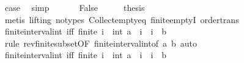 \begin{isabellebody}
\ {\isacharquery}{\kern0pt}case\ \isamarkupfalse%
\ simp\isanewline
\ \ \isamarkupfalse%
\isanewline
{}\isamarkupfalse%
\isanewline
\ \ \isamarkupfalse%
\ False\isanewline
\ \ \isamarkupfalse%
\ \isamarkupfalse%
\ {\isacharquery}{\kern0pt}thesis\isanewline
\ \ \ \ \isamarkupfalse%
\ {\isacharparenleft}{\kern0pt}metis\ {\isacharparenleft}{\kern0pt}lifting{\isacharcomma}{\kern0pt}\ no{\isacharunderscore}{\kern0pt}types{\isacharparenright}{\kern0pt}\ Collect{\isacharunderscore}{\kern0pt}empty{\isacharunderscore}{\kern0pt}eq\ finite{\isachardot}{\kern0pt}emptyI\ order{\isacharunderscore}{\kern0pt}trans{\isacharparenright}{\kern0pt}\isanewline
{}\isamarkupfalse%
%
\endisatagproof
{\isafoldproof}%
%
\isadelimproof
\isanewline
%
\endisadelimproof
\isanewline
{}\isamarkupfalse%
\ finite{\isacharunderscore}{\kern0pt}interval{\isacharunderscore}{\kern0pt}int{}\ {\isacharbrackleft}{\kern0pt}iff{\isacharbrackright}{\kern0pt}{\isacharcolon}{\kern0pt}\ {\isachardoublequoteopen}finite\ {\isacharbraceleft}{\kern0pt}i\ {\isacharcolon}{\kern0pt}{\isacharcolon}{\kern0pt}\ int{\isachardot}{\kern0pt}\ a\ {\isasymle}\ i\ {\isasymand}\ i\ {\isacharless}{\kern0pt}\ b{\isacharbraceright}{\kern0pt}{\isachardoublequoteclose}\isanewline
%
\isadelimproof
\ \ %
\endisadelimproof
%
\isatagproof
{}\isamarkupfalse%
\ {\isacharparenleft}{\kern0pt}rule\ rev{\isacharunderscore}{\kern0pt}finite{\isacharunderscore}{\kern0pt}subset{\isacharbrackleft}{\kern0pt}OF\ finite{\isacharunderscore}{\kern0pt}interval{\isacharunderscore}{\kern0pt}int{}{\isacharbrackleft}{\kern0pt}of\ {\isachardoublequoteopen}a{\isachardoublequoteclose}\ {\isachardoublequoteopen}b{\isachardoublequoteclose}{\isacharbrackright}{\kern0pt}{\isacharbrackright}{\kern0pt}{\isacharparenright}{\kern0pt}\ auto%
\endisatagproof
{\isafoldproof}%
%
\isadelimproof
\isanewline
%
\endisadelimproof
\isanewline
{}\isamarkupfalse%
\ finite{\isacharunderscore}{\kern0pt}interval{\isacharunderscore}{\kern0pt}int{}\ {\isacharbrackleft}{\kern0pt}iff{\isacharbrackright}{\kern0pt}{\isacharcolon}{\kern0pt}\ {\isachardoublequoteopen}finite\ {\isacharbraceleft}{\kern0pt}i\ {\isacharcolon}{\kern0pt}{\isacharcolon}{\kern0pt}\ int{\isachardot}{\kern0pt}\ a\ {\isacharless}{\kern0pt}\ i\ {\isasymand}\ i\ {\isasymle}\ b{\isacharbraceright}{\kern0pt}{\isachardoublequoteclose}\isanewline
%
\isadelimproof
\ \ %
\endisadelimproof
%
\isatagproof
{}\isamarkupfalse%

\end{isabellebody}
